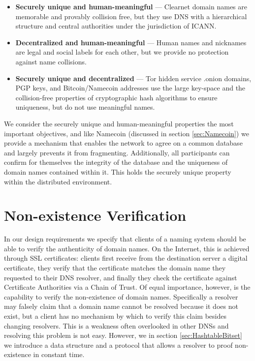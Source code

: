 \begin{itemize}
	\item \textbf{Securely unique and human-meaningful} --- Clearnet domain names are memorable and provably collision free, but they use DNS with a hierarchical structure and central authorities under the jurisdiction of ICANN.
	\item \textbf{Decentralized and human-meaningful} --- Human names and nicknames are legal and social labels for each other, but we provide no protection against name collisions.
	\item \textbf{Securely unique and decentralized} --- Tor hidden service .onion domains, PGP keys, and Bitcoin/Namecoin addresses use the large key-space and the collision-free properties of cryptographic hash algorithms to ensure uniqueness, but do not use meaningful names.
\end{itemize}

We consider the securely unique and human-meaningful properties the most important objectives, and like Namecoin (discussed in section \ref{sec:Namecoin}) we provide a mechanism that enables the network to agree on a common database and largely prevents it from fragmenting. Additionally, all participants can confirm for themselves the integrity of the database and the uniqueness of domain names contained within it. This holds the securely unique property within the distributed environment. 

\section{Non-existence Verification}

In our design requirements we specify that clients of a naming system should be able to verify the authenticity of domain names. On the Internet, this is achieved through SSL certificates: clients first receive from the destination server a digital certificate, they verify that the certificate matches the domain name they requested to their DNS resolver, and finally they check the certificate against Certificate Authorities via a Chain of Trust. Of equal importance, however, is the capability to verify the non-existence of domain names. Specifically a resolver may falsely claim that a domain name cannot be resolved because it does not exist, but a client has no mechanism by which to verify this claim besides changing resolvers. This is a weakness often overlooked in other DNSs and resolving this problem is not easy. However, we in section \ref{sec:HashtableBitset} we introduce a data structure and a protocol that allows a resolver to proof non-existence in constant time.

